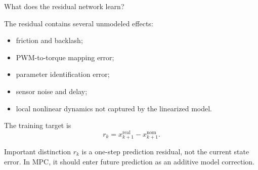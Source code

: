 \documentclass[aspectratio=169]{beamer}
\begin{document}
\begin{frame}{What does the residual network learn?}

The residual contains several unmodeled effects:

\begin{itemize}
    \item friction and backlash;
    \vspace{0.12cm}

    \item PWM-to-torque mapping error;
    \vspace{0.12cm}

    \item parameter identification error;
    \vspace{0.12cm}

    \item sensor noise and delay;
    \vspace{0.12cm}

    \item local nonlinear dynamics not captured by the linearized model.
\end{itemize}

\vspace{0.2cm}

The training target is
\[
r_k=
x_{k+1}^{\mathrm{real}}
-
x_{k+1}^{\mathrm{nom}}.
\]

\vspace{0.15cm}

\begin{alertblock}{Important distinction}
\small
\(r_k\) is a one-step prediction residual, not the current state error.
In MPC, it should enter future prediction as an additive model correction.
\end{alertblock}

\end{frame}
\end{document}
